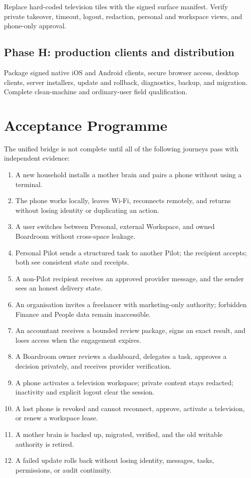 \documentclass[11pt,a4paper]{article}
\begin{document}
Replace hard-coded television tiles with the signed surface manifest.  Verify
private takeover, timeout, logout, redaction, personal and workspace views, and
phone-only approval.

\subsection{Phase H: production clients and distribution}

Package signed native iOS and Android clients, secure browser access, desktop
clients, server installers, update and rollback, diagnostics, backup, and
migration.  Complete clean-machine and ordinary-user field qualification.

\section{Acceptance Programme}

The unified bridge is not complete until all of the following journeys pass
with independent evidence:

\begin{enumerate}[leftmargin=*]
  \item A new household installs a mother brain and pairs a phone without using a terminal.
  \item The phone works locally, leaves Wi-Fi, reconnects remotely, and returns without losing identity or duplicating an action.
  \item A user switches between Personal, external Workspace, and owned Boardroom without cross-space leakage.
  \item Personal Pilot sends a structured task to another Pilot; the recipient accepts; both see consistent state and receipts.
  \item A non-Pilot recipient receives an approved provider message, and the sender sees an honest delivery state.
  \item An organisation invites a freelancer with marketing-only authority; forbidden Finance and People data remain inaccessible.
  \item An accountant receives a bounded review package, signs an exact result, and loses access when the engagement expires.
  \item A Boardroom owner reviews a dashboard, delegates a task, approves a decision privately, and receives provider verification.
  \item A phone activates a television workspace; private content stays redacted; inactivity and explicit logout clear the session.
  \item A lost phone is revoked and cannot reconnect, approve, activate a television, or renew a workspace lease.
  \item A mother brain is backed up, migrated, verified, and the old writable authority is retired.
  \item A failed update rolls back without losing identity, messages, tasks, permissions, or audit continuity.
\end{enumerate}
\end{document}
